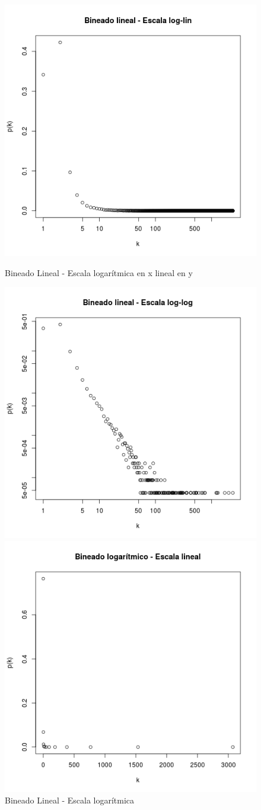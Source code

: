 \documentclass{article}
\begin{document}
\begin{figure}[!htb]
\begin{minipage}{0.3\textwidth}
	\includegraphics[width=.7\linewidth]{Imagenes_P3/P3_binlin_loglin.png}
	\caption{Bineado Lineal - Escala logarítmica en x lineal en y}
	\label{pt3linloglin}
   \end{minipage}\hfill
      \begin{minipage}{0.3\textwidth}
	\centering
	\includegraphics[width=.7\linewidth]{Imagenes_P3/P3_binlin_loglog.png}
	\caption{Bineado Lineal - Escala logarítmica}
	\label{pt3linloglog}
   \end{minipage}\hfill
      \begin{minipage}{0.3\textwidth}
	\centering
	\includegraphics[width=.7\linewidth]{Imagenes_P3/P3_binlog_lin.png}

\end{minipage}
\end{figure}
\end{document}
